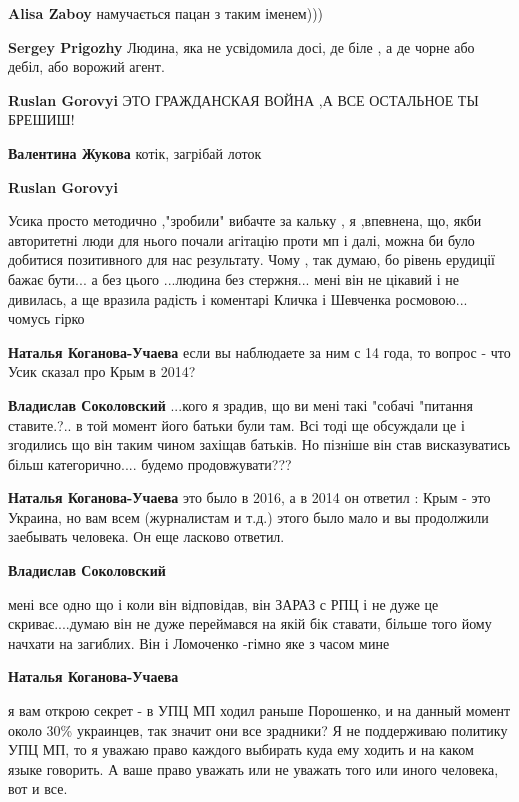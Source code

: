 \begin{itemize}
\begin{itemize}

\textbf{Alisa Zaboy} намучається пацан з таким іменем)))

\textbf{Sergey Prigozhy} Людина, яка не усвідомила досі, де біле , а де чорне або дебіл, або ворожий агент.

\textbf{Ruslan Gorovyi} ЭТО ГРАЖДАНСКАЯ ВОЙНА ,А ВСЕ ОСТАЛЬНОЕ ТЫ БРЕШИШ!


\textbf{Валентина Жукова} котік, загрібай лоток

\textbf{Ruslan Gorovyi} 

Усика просто методично ,"зробили" вибачте за кальку , я ,впевнена, що, якби
авторитетні люди для нього почали агітацію проти мп і далі, можна би було
добитися позитивного для нас результату. Чому , так думаю, бо рівень ерудиції
бажає бути... а без цього ...людина без стержня... мені він не цікавий і не
дивилась, а ще вразила радість і коментарі Кличка і Шевченка росмовою... чомусь
гірко

\textbf{Наталья Коганова-Учаева} если вы наблюдаете за ним с 14 года, то вопрос - что Усик сказал про Крым в 2014?

\textbf{Владислав Соколовский} ...кого я зрадив, що ви мені такі "собачі "питання ставите.?.. в той момент його батьки були там. Всі тоді ще обсуждали це і згодились що він таким чином захіщав батьків. Но пізніше він став висказуватись більш категорично.... будемо продовжувати???

\textbf{Наталья Коганова-Учаева} это было в 2016, а в 2014 он ответил : Крым - это Украина, но вам всем (журналистам и т.д.) этого было мало и вы продолжили заебывать человека. Он еще ласково ответил.

\textbf{Владислав Соколовский} 

мені все одно що і коли він відповідав, він ЗАРАЗ с РПЦ і не дуже це
скриває....думаю він не дуже переймався на якій бік ставати, більше того йому
начхати на загиблих. Він і Ломоченко -гімно яке з часом мине


\textbf{Наталья Коганова-Учаева} 

я вам открою секрет - в УПЦ МП ходил раньше Порошенко, и на данный момент около
30\% украинцев, так значит они все зрадники? Я не поддерживаю политику УПЦ МП,
то я уважаю право каждого выбирать куда ему ходить и на каком языке говорить. А
ваше право уважать или не уважать того или иного человека, вот и все.


\end{itemize}
\end{itemize}
